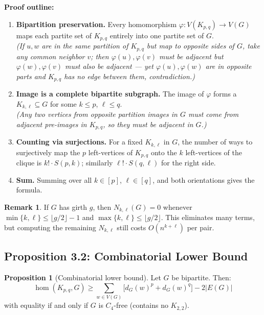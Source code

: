 \documentclass[12pt,a4paper]{article}
\theoremstyle{definition}
\newtheorem{proposition}[theorem]{Proposition}
\newtheorem{remark}[theorem]{Remark}
\newcommand{\hom}{\operatorname{hom}}
\begin{document}
\textbf{Proof outline:}
\begin{enumerate}
  \item \textbf{Bipartition preservation.} Every homomorphism $\varphi: V(K_{p,q}) \to V(G)$ maps each
    partite set of $K_{p,q}$ entirely into one partite set of $G$. \\
    \textit{(If $u,w$ are in the same partition of $K_{p,q}$ but map to opposite sides of $G$, take any
    common neighbor $v$; then $\varphi(u),\varphi(v)$ must be adjacent but $\varphi(w),\varphi(v)$ must
    also be adjacent — yet $\varphi(u),\varphi(w)$ are in opposite parts and $K_{p,q}$ has no edge between
    them, contradiction.)}

  \item \textbf{Image is a complete bipartite subgraph.} The image of $\varphi$ forms a $K_{k,\ell}
    \subseteq G$ for some $k \leq p$, $\ell \leq q$. \\
    \textit{(Any two vertices from opposite partition images in $G$ must come from adjacent pre-images in
    $K_{p,q}$, so they must be adjacent in $G$.)}

  \item \textbf{Counting via surjections.} For a fixed $K_{k,\ell}$ in $G$, the number of ways to
    surjectively map the $p$ left-vertices of $K_{p,q}$ onto the $k$ left-vertices of the clique is
    $k! \cdot S(p,k)$; similarly $\ell! \cdot S(q,\ell)$ for the right side.

  \item \textbf{Sum.} Summing over all $k \in [p]$, $\ell \in [q]$, and both orientations gives the
    formula.
\end{enumerate}

\begin{remark}
  If $G$ has girth $g$, then $N_{k,\ell}(G) = 0$ whenever $\min\{k,\ell\} \leq \lfloor g/2 \rfloor - 1$
  and $\max\{k,\ell\} \leq \lfloor g/2 \rfloor$. This eliminates many terms, but computing the remaining
  $N_{k,\ell}$ still costs $O(n^{k+\ell})$ per pair.
\end{remark}

\subsection{Proposition 3.2: Combinatorial Lower Bound}

\begin{proposition}[Combinatorial lower bound]
  Let $G$ be bipartite. Then:
  \[
    \hom(K_{p,q}, G) \geq \sum_{w \in V(G)} \bigl[d_G(w)^p + d_G(w)^q\bigr] - 2|E(G)|
  \]
  with equality if and only if $G$ is $C_4$-free (contains no $K_{2,2}$).
\end{proposition}
\end{document}
